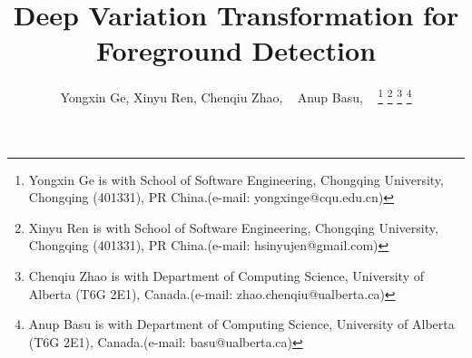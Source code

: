 \documentclass[journal]{IEEEtran}
\begin{document}
\title{Deep Variation Transformation for Foreground Detection}

\author{Yongxin Ge, 
        Xinyu Ren, 
        Chenqiu Zhao, ~
        Anup Basu, ~
        \thanks{Yongxin Ge is with School of Software Engineering, Chongqing University, Chongqing (401331), PR China.(e-mail: yongxinge@cqu.edu.cn)}
        \thanks{Xinyu Ren is with School of Software Engineering, Chongqing University, Chongqing (401331), PR China.(e-mail: hsinyujen@gmail.com)}
        \thanks{Chenqiu Zhao is with Department of Computing Science, University of Alberta (T6G 2E1), Canada.(e-mail: zhao.chenqiu@ualberta.ca)}
        \thanks{Anup Basu is with Department of Computing Science, University of Alberta (T6G 2E1), Canada.(e-mail: basu@ualberta.ca)}
        }




\maketitle
\end{document}
